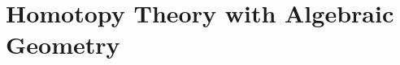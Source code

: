\section{Homotopy Theory with Algebraic Geometry}\label{sec:chromatic-more-geometryhomotopy}

\begin{definition}

\end{definition}